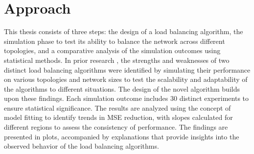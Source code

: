 \section{Approach}\label{sec:approach}
This thesis consists of three steps: the design of a load balancing algorithm, the simulation phase to test its ability to balance the network across different topologies, and a comparative analysis of the simulation outcomes using statistical methods. In prior research \cite{Bayazitoglu}, the strengths and weaknesses of two distinct load balancing algorithms were identified by simulating their performance on various topologies and network sizes to test the scalability and adaptability of the algorithms to different situations. The design of the novel algorithm builds upon these findings. Each simulation outcome includes 30 distinct experiments to ensure statistical significance. The results are analyzed using the concept of model fitting to identify trends in MSE reduction, with slopes calculated for different regions to assess the consistency of performance. The findings are presented in plots, accompanied by explanations that provide insights into the observed behavior of the load balancing algorithms.

